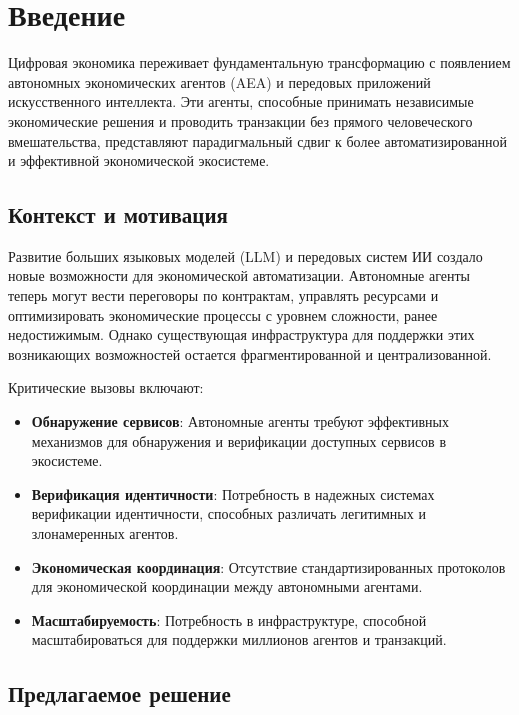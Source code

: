 \documentclass[12pt,a4paper]{article}
\begin{document}
\newpage
\tableofcontents
\newpage

\section{Введение}

Цифровая экономика переживает фундаментальную трансформацию с появлением автономных экономических агентов (AEA) и передовых приложений искусственного интеллекта. Эти агенты, способные принимать независимые экономические решения и проводить транзакции без прямого человеческого вмешательства, представляют парадигмальный сдвиг к более автоматизированной и эффективной экономической экосистеме.

\subsection{Контекст и мотивация}

Развитие больших языковых моделей (LLM) и передовых систем ИИ создало новые возможности для экономической автоматизации. Автономные агенты теперь могут вести переговоры по контрактам, управлять ресурсами и оптимизировать экономические процессы с уровнем сложности, ранее недостижимым. Однако существующая инфраструктура для поддержки этих возникающих возможностей остается фрагментированной и централизованной.

Критические вызовы включают:

\begin{itemize}
\item \textbf{Обнаружение сервисов}: Автономные агенты требуют эффективных механизмов для обнаружения и верификации доступных сервисов в экосистеме.
\item \textbf{Верификация идентичности}: Потребность в надежных системах верификации идентичности, способных различать легитимных и злонамеренных агентов.
\item \textbf{Экономическая координация}: Отсутствие стандартизированных протоколов для экономической координации между автономными агентами.
\item \textbf{Масштабируемость}: Потребность в инфраструктуре, способной масштабироваться для поддержки миллионов агентов и транзакций.
\end{itemize}

\subsection{Предлагаемое решение}
\end{document}
